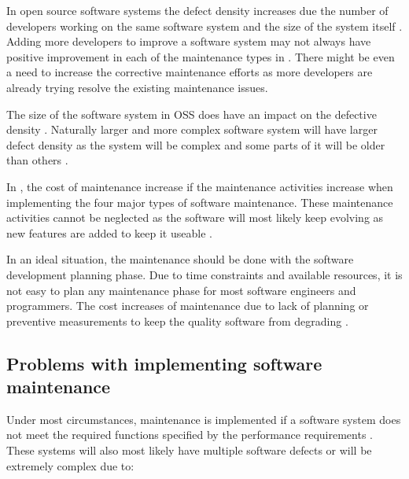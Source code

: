 In open source software systems the defect density increases due the number of developers working on the same software system and the size of the system itself \cite{Rahmani2010}. Adding more developers to improve a software system may not always have positive improvement in each of the maintenance types in . There might be even a need to increase the corrective maintenance efforts as more developers are already trying resolve the existing maintenance issues.\par The size of the software system in OSS does have an impact on the defective density \cite{Rahmani2010}. Naturally larger and more complex software system will have larger defect density as the system will be complex and some parts of it will be older than others \cite{SourceForged2009}. 

In , the cost of maintenance increase if the maintenance activities increase when implementing the four major types of software maintenance. These maintenance activities cannot be neglected as the software will most likely keep evolving as new features are added to keep it useable \cite{Alenezi2016}. \par In an ideal situation, the maintenance should be done with the software development planning phase. Due to time constraints and available resources, it is not easy to plan any maintenance phase for most software engineers and programmers. The cost increases of maintenance due to lack of planning or preventive measurements to keep the quality software from degrading \cite{Alenezi2016}.

\subsection{Problems with implementing software maintenance}\label{sec:Maintenance_problems}

Under most circumstances, maintenance is implemented if a software system does not meet the required functions specified by the performance requirements \cite{Ogheneovo2014, Sneed2004}. These systems will also most likely have multiple software defects or will be extremely complex due to:

